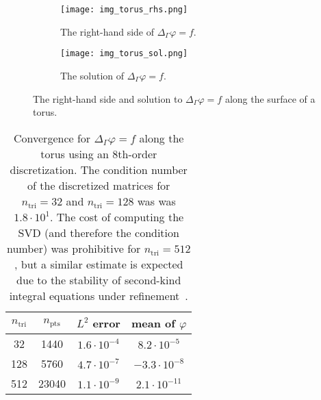 \documentclass[11pt]{article}
\renewcommand{\phi}{\varphi}
\newcommand{\surflap}{\Delta_\Gamma}
\newcommand{\ntri}{n_{\text{tri}}}
\newcommand{\npts}{n_{\text{pts}}}
\numberwithin{equation}{section}
\begin{document}
\begin{figure}[!t]
  \begin{center}
    \begin{subfigure}[b]{.45\linewidth}
      \centering
      \texttt{[image: img\_torus\_rhs.png]}
      \caption{The right-hand side of $\surflap \phi = f$.}
      \label{fig_tor_rhs}
    \end{subfigure}
    \quad
    \begin{subfigure}[b]{.45\linewidth}
      \centering
      \texttt{[image: img\_torus\_sol.png]}
      \caption{The solution of $\surflap \phi = f$.}
      \label{fig_tor_sol}
    \end{subfigure}
    \caption{The right-hand side and solution to $\surflap \phi = f$
      along the surface of a torus. }
    \label{fig_tor}
  \end{center}
\end{figure}



\begin{table}[b]
  \begin{center}
    \caption{Convergence for $\surflap \phi = f$ along the torus using
      an 8th-order discretization. The condition number of the
      discretized matrices for $\ntri=32$ and $\ntri=128$ was was $1.8
      \cdot 10^{1}$. The cost of computing the SVD (and therefore the
      condition number) was prohibitive for $\ntri=512$, but a similar
      estimate is expected due to the stability of second-kind
      integral equations under
      refinement~\cite{anselone_1971,atkinson_1997}.}
    \label{tab_torconv}
    \begin{tabular}{|cc|cc|} \hline
      $\ntri$ & $\npts$ & $L^2$ error
      & mean of $\phi$ \\ \hline
      32  & 1440 &  $ 1.6 \cdot 10^{-4}$ & $ 8.2 \cdot 10^{-5}$ \\ \hline
      128  & 5760 & $ 4.7 \cdot 10^{-7}$ & $ -3.3\cdot 10^{-8}$ \\ \hline
      512  & 23040 & $ 1.1 \cdot 10^{-9}$ & $ 2.1 \cdot 10^{-11}$ \\ \hline
    \end{tabular}
  \end{center}
\end{table}
\end{document}
